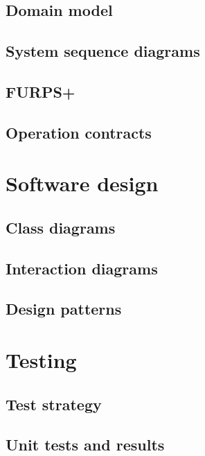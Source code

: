 \documentclass[a4paper,11pt]{article}
\begin{document}
\subsection{Domain model}


\subsection{System sequence diagrams}


\subsection{FURPS+}


\subsection{Operation contracts}


\pagebreak
\section{Software design}


\subsection{Class diagrams}


\subsection{Interaction diagrams}


\subsection{Design patterns}


\pagebreak

\pagebreak

\pagebreak
\section{Testing}


\subsection{Test strategy}


\subsection{Unit tests and results}


\pagebreak


\pagebreak


\pagebreak
\appendix

\end{document}
